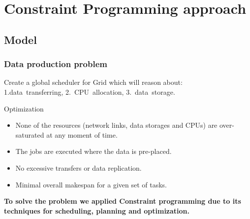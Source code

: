 \documentclass{beamer}
\begin{document}
\section{Constraint Programming approach}
\subsection{Model}
\begin{frame}\frametitle{Data production problem}
 		\begin{block}{}
Create a global scheduler for Grid which will reason about:\\
\hspace{1cm} 1.data~transferring, \hspace{1cm} 2.~CPU~allocation,\hspace{1cm} 3.~data~storage.  
\end{block}
\begin{block}{Optimization}  
		\begin{itemize}
			\item None of the resources (network links, data storages and CPUs) are over-saturated at any moment of time.
			\item The jobs are executed  where the data is pre-placed.
			\item No excessive transfers or data replication.
			\item Minimal overall makespan for a given set of tasks.
		\end{itemize}
 	\end{block}
\begin{block}{}
\textbf{To solve the problem we applied Constraint programming due to its techniques for scheduling, planning and optimization.}
 	\end{block} 	
\end{frame}
\end{document}
